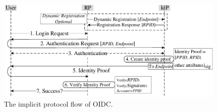 \begin{figure}
  \centering
  \includegraphics[width=\linewidth]{fig/OIDC.pdf}
  \caption{The implicit protocol flow of OIDC.}
  \label{fig:OpenID}
\end{figure}

